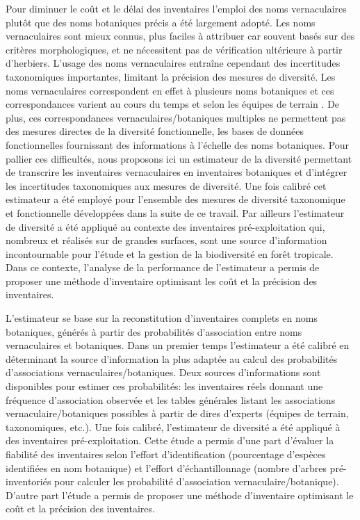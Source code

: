 \documentclass[
  11pt,
  french,
  A4paper,
  extrafontsizes,onecolumn,openright
  ]{memoir}
\begin{document}
Pour diminuer le coût et le délai des inventaires l'emploi des noms
vernaculaires plutôt que des noms botaniques précis a été largement
adopté. Les noms vernaculaires sont mieux connus, plus faciles à
attribuer car souvent basés sur des critères morphologiques, et ne
nécessitent pas de vérification ultérieure à partir d'herbiers. L'usage
des noms vernaculaires entraîne cependant des incertitudes taxonomiques
importantes, limitant la précision des mesures de diversité. Les noms
vernaculaires correspondent en effet à plusieurs noms botaniques et ces
correspondances varient au cours du temps et selon les équipes de
terrain \autocite{Oldeman1968}. De plus, ces correspondances
vernaculaires/botaniques multiples ne permettent pas des mesures
directes de la diversité fonctionnelle, les bases de données
fonctionnelles fournissant des informations à l'échelle des noms
botaniques. Pour pallier ces difficultés, nous proposons ici un
estimateur de la diversité permettant de transcrire les inventaires
vernaculaires en inventaires botaniques et d'intégrer les incertitudes
taxonomiques aux mesures de diversité. Une fois calibré cet estimateur a
été employé pour l'ensemble des mesures de diversité taxonomique et
fonctionnelle développées dans la suite de ce travail. Par ailleurs
l'estimateur de diversité a été appliqué au contexte des inventaires
pré-exploitation qui, nombreux et réalisés sur de grandes surfaces, sont
une source d'information incontournable
\autocites{TerSteege2000}{Guitet2014} pour l'étude et la gestion de la
biodiversité en forêt tropicale. Dans ce contexte, l'analyse de la
performance de l'estimateur a permis de proposer une méthode
d'inventaire optimisant les coût et la précision des inventaires.

L'estimateur se base sur la reconstitution d'inventaires complets en
noms botaniques, générés à partir des probabilités d'association entre
noms vernaculaires et botaniques. Dans un premier temps l'estimateur a
été calibré en déterminant la source d'information la plus adaptée au
calcul des probabilités d'associations vernaculaires/botaniques. Deux
sources d'informations sont disponibles pour estimer ces probabilités:
les inventaires réels donnant une fréquence d'association observée et
les tables générales listant les associations vernaculaire/botaniques
possibles à partir de dires d'experts (équipes de terrain, taxonomiques,
etc.). Une fois calibré, l'estimateur de diversité a été appliqué à des
inventaires pré-exploitation. Cette étude a permis d'une part d'évaluer
la fiabilité des inventaires selon l'effort d'identification
(pourcentage d'espèces identifiées en nom botanique) et l'effort
d'échantillonnage (nombre d'arbres pré-inventoriés pour calculer les
probabilité d'association vernaculaire/botanique). D'autre part l'étude
a permis de proposer une méthode d'inventaire optimisant le coût et la
précision des inventaires.
\end{document}
